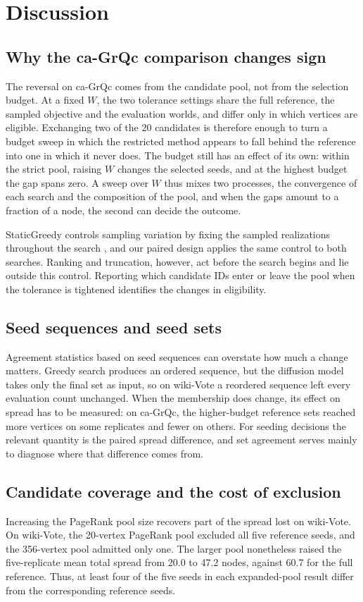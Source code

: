 \documentclass[smallextended]{svjour3}
\begin{document}
\section{Discussion}
\subsection{Why the ca-GrQc comparison changes sign}
The reversal on ca-GrQc comes from the candidate pool, not from the selection budget. At a fixed $W$, the two tolerance settings share the full reference, the sampled objective and the evaluation worlds, and differ only in which vertices are eligible. Exchanging two of the 20 candidates is therefore enough to turn a budget sweep in which the restricted method appears to fall behind the reference into one in which it never does. The budget still has an effect of its own: within the strict pool, raising $W$ changes the selected seeds, and at the highest budget the gap spans zero. A sweep over $W$ thus mixes two processes, the convergence of each search and the composition of the pool, and when the gaps amount to a fraction of a node, the second can decide the outcome.

StaticGreedy controls sampling variation by fixing the sampled realizations throughout the search \cite{ref8}, and our paired design applies the same control to both searches. Ranking and truncation, however, act before the search begins and lie outside this control. Reporting which candidate IDs enter or leave the pool when the tolerance is tightened identifies the changes in eligibility.

\subsection{Seed sequences and seed sets}
Agreement statistics based on seed sequences can overstate how much a change matters. Greedy search produces an ordered sequence, but the diffusion model takes only the final set as input, so on wiki-Vote a reordered sequence left every evaluation count unchanged. When the membership does change, its effect on spread has to be measured: on ca-GrQc, the higher-budget reference sets reached more vertices on some replicates and fewer on others. For seeding decisions the relevant quantity is the paired spread difference, and set agreement serves mainly to diagnose where that difference comes from.

\subsection{Candidate coverage and the cost of exclusion}
Increasing the PageRank pool size recovers part of the spread lost on wiki-Vote. On wiki-Vote, the 20-vertex PageRank pool excluded all five reference seeds, and the 356-vertex pool admitted only one. The larger pool nonetheless raised the five-replicate mean total spread from 20.0 to 47.2 nodes, against 60.7 for the full reference. Thus, at least four of the five seeds in each expanded-pool result differ from the corresponding reference seeds.
\end{document}
